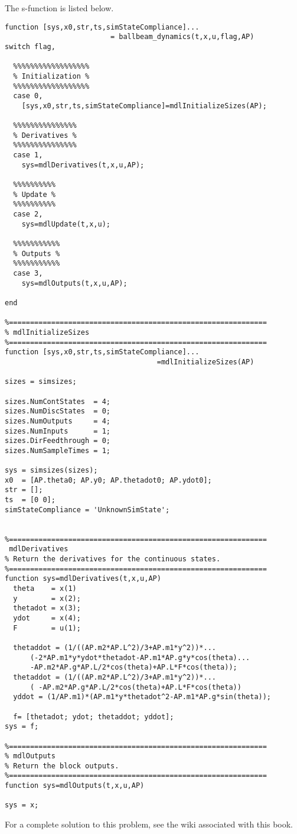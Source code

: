 
The s-function is listed below.
\begin{lstlisting}
function [sys,x0,str,ts,simStateCompliance]...
						 = ballbeam_dynamics(t,x,u,flag,AP)
switch flag,

  %%%%%%%%%%%%%%%%%%
  % Initialization %
  %%%%%%%%%%%%%%%%%%
  case 0,
    [sys,x0,str,ts,simStateCompliance]=mdlInitializeSizes(AP);

  %%%%%%%%%%%%%%%
  % Derivatives %
  %%%%%%%%%%%%%%%
  case 1,
    sys=mdlDerivatives(t,x,u,AP);

  %%%%%%%%%%
  % Update %
  %%%%%%%%%%
  case 2,
    sys=mdlUpdate(t,x,u);

  %%%%%%%%%%%
  % Outputs %
  %%%%%%%%%%%
  case 3,
    sys=mdlOutputs(t,x,u,AP);

end

%=============================================================
% mdlInitializeSizes
%=============================================================
function [sys,x0,str,ts,simStateCompliance]...
									=mdlInitializeSizes(AP)

sizes = simsizes;

sizes.NumContStates  = 4;
sizes.NumDiscStates  = 0;
sizes.NumOutputs     = 4;
sizes.NumInputs      = 1;
sizes.DirFeedthrough = 0;
sizes.NumSampleTimes = 1;   

sys = simsizes(sizes);
x0  = [AP.theta0; AP.y0; AP.thetadot0; AP.ydot0];
str = [];
ts  = [0 0];
simStateCompliance = 'UnknownSimState';


%=============================================================
 mdlDerivatives
% Return the derivatives for the continuous states.
%=============================================================
function sys=mdlDerivatives(t,x,u,AP)
  theta    = x(1)
  y        = x(2);
  thetadot = x(3);
  ydot     = x(4);
  F        = u(1);
  
  thetaddot = (1/((AP.m2*AP.L^2)/3+AP.m1*y^2))*...
      (-2*AP.m1*y*ydot*thetadot-AP.m1*AP.g*y*cos(theta)...
      -AP.m2*AP.g*AP.L/2*cos(theta)+AP.L*F*cos(theta));
  thetaddot = (1/((AP.m2*AP.L^2)/3+AP.m1*y^2))*...
      ( -AP.m2*AP.g*AP.L/2*cos(theta)+AP.L*F*cos(theta))
  yddot = (1/AP.m1)*(AP.m1*y*thetadot^2-AP.m1*AP.g*sin(theta));   

  f= [thetadot; ydot; thetaddot; yddot];
sys = f;

%=============================================================
% mdlOutputs
% Return the block outputs.
%=============================================================
function sys=mdlOutputs(t,x,u,AP)

sys = x;

\end{lstlisting}

For a complete solution to this problem, see the wiki associated with this book.
